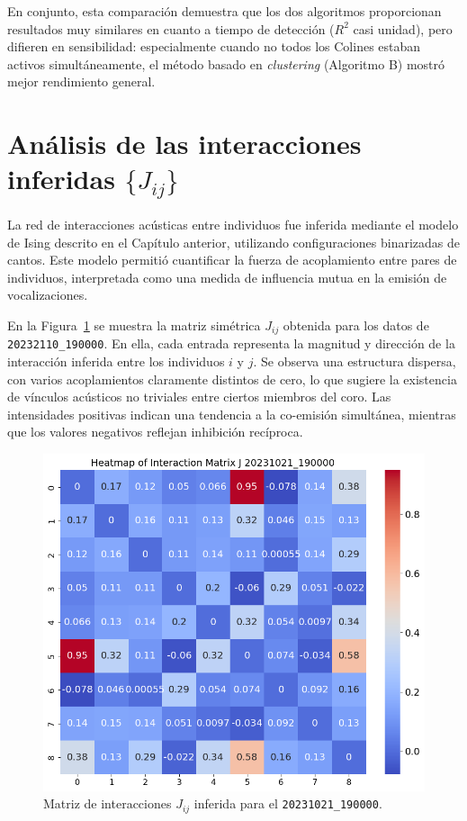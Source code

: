 En conjunto, esta comparación demuestra que los dos algoritmos 
proporcionan resultados muy similares en cuanto a tiempo de 
detección (\(R^2\) casi unidad), pero difieren en sensibilidad: 
especialmente cuando no todos los Colines 
estaban activos simultáneamente, el método basado en \textit{clustering} 
(Algoritmo B) mostró mejor rendimiento general.



\section{Análisis de las interacciones inferidas \(\{J_{ij}\}\)}
\label{sec:res_interacciones}


La red de interacciones acústicas entre individuos fue inferida 
mediante el modelo de Ising descrito en el Capítulo anterior, 
utilizando configuraciones binarizadas de cantos. 
Este modelo permitió 
cuantificar la fuerza de acoplamiento entre pares de individuos, 
interpretada como una medida de influencia mutua en la emisión 
de vocalizaciones. 

En la Figura~\ref{fig:jij} se muestra la matriz simétrica 
\( J_{ij} \) obtenida para los datos de \texttt{20232110\_190000}. 
En ella, cada entrada 
representa la magnitud y dirección de la interacción inferida 
entre los individuos \( i \) y \( j \). Se observa una 
estructura dispersa, con varios acoplamientos claramente 
distintos de cero, lo que sugiere la existencia de vínculos 
acústicos no triviales entre ciertos miembros del coro. Las 
intensidades positivas indican una tendencia a la co-emisión 
simultánea, mientras que los valores negativos reflejan 
inhibición recíproca.

\begin{figure}[htbp]
    \centering
    \includegraphics[width=0.7\linewidth]{Graphics/matrix_jij.png}
    \caption{Matriz de interacciones \( J_{ij} \) inferida para el \texttt{20231021\_190000}.}
    \label{fig:jij}
\end{figure}

